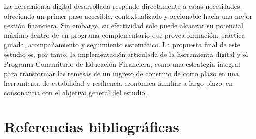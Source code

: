 \documentclass[12pt,letterpaper]{article}
\begin{document}
La herramienta digital desarrollada responde directamente a estas necesidades, ofreciendo un primer paso accesible, contextualizado y accionable hacia una mejor gestión financiera. Sin embargo, su efectividad solo puede alcanzar su potencial máximo dentro de un programa complementario que provea formación, práctica guiada, acompañamiento y seguimiento sistemático. La propuesta final de este estudio es, por tanto, la implementación articulada de la herramienta digital y el Programa Comunitario de Educación Financiera, como una estrategia integral para transformar las remesas de un ingreso de consumo de corto plazo en una herramienta de estabilidad y resiliencia económica familiar a largo plazo, en consonancia con el objetivo general del estudio.

\clearpage
\section*{Referencias bibliográficas}
\end{document}
